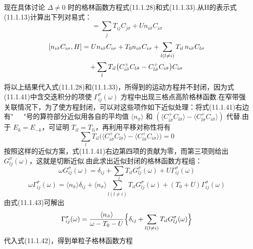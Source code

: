 现在具体讨论 $\Delta\neq0$ 时的格林函数方程式(11.1.28)和式(11.1.33).从H的表示式(11.1.13)计算出下列对易式：
\begin{equation}
  [C_{i\sigma},H]=\sum_{j}T_{ij}C_{j\sigma}+Un_{i\bar{\sigma}}C_{i\sigma}
\end{equation}
\begin{equation}
\begin{aligned}
  \relax[n_{i\bar{\sigma}}C_{i\sigma},H]&=Un_{i\bar{\sigma}}C_{i\sigma}
  +T_{0}n_{i\bar{\sigma}}C_{i\sigma}
  +\sum_{l(l\neq i)}T_{il}\,n_{i\bar{\sigma}}C_{l\sigma}\\
  &\quad+\sum_{l}T_{il}
  \bigl(C^{+}_{i\bar{\sigma}}C_{l\bar{\sigma}}
  -C^{+}_{l\bar{\sigma}}C_{i\bar{\sigma}}\bigr)C_{i\sigma}
\end{aligned}
\end{equation}
将以上结果代入式(11.1.28)和(11.1.33)，所得到的运动方程并不封闭，因为式(11.1.41)中含交迭积分的项使 $\Gamma^{\sigma}_{ij}(\omega)$ 方程中出现三格点高阶格林函数.在窄带强关联情况下，为了使方程封闭，可以对这些项作如下近似处理：将式(11.1.41)右边有"~~~"号的算符部分近似用各自的平均值 $\langle n_{\bar{\sigma}}\rangle$ 和 $(\langle C^{+}_{i\bar{\sigma}}C_{l\bar{\sigma}}\rangle-\langle C^{+}_{l\bar{\sigma}}C_{i\bar{\sigma}}\rangle)$ 代替.由于 $E_{k}=E_{-k}$，可证明 $T_{il}=T_{li}$，再利用平移对称性将有
\begin{equation*}
  \sum_{l}T_{il}\bigl(\langle C^{+}_{i\bar{\sigma}}C_{l\bar{\sigma}}\rangle
  -\langle C^{+}_{l\bar{\sigma}}C_{i\bar{\sigma}}\rangle\bigr)=0
\end{equation*}
按照这样的近似方案，式(11.1.41)右边第四项的贡献为零，而第三项则给出 $G^{\sigma}_{lj}(\omega)$，这就是切断近似.由此求出近似封闭的格林函数方程组：
\begin{equation}
  \omega G^{\sigma}_{ij}(\omega)=\delta_{ij}
  +\sum_{l}T_{il}G^{\sigma}_{lj}(\omega)+U\Gamma^{\sigma}_{ij}(\omega)
\end{equation}
\begin{equation}
  \omega\Gamma^{\sigma}_{ij}(\omega)=\langle n_{\bar{\sigma}}\rangle\delta_{ij}
  +\langle n_{\bar{\sigma}}\rangle\sum_{l(l\neq i)}T_{il}G^{\sigma}_{lj}(\omega)
  +(T_{0}+U)\Gamma^{\sigma}_{ij}(\omega)
\end{equation}
由式(11.1.43)可解出
\begin{equation}
  \Gamma^{\sigma}_{ij}(\omega)=\frac{\langle n_{\bar{\sigma}}\rangle}{\omega-T_{0}-U}
  \Bigl\{\delta_{ij}+\sum_{l(l\neq i)}T_{il}G^{\sigma}_{lj}(\omega)\Bigr\}
\end{equation}
代入式(11.1.42)，得到单粒子格林函数方程
